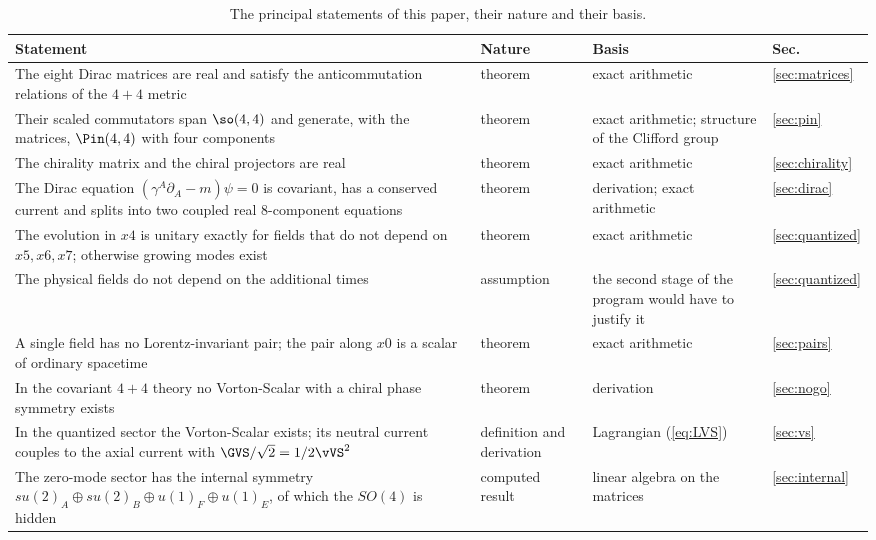 \begin{table}
\caption{\label{tab:status}The principal statements of this paper, their nature and their basis.}
\begin{ruledtabular}
\begin{tabular}{>{\raggedright\arraybackslash}p{}>{\raggedright\arraybackslash}p{}>{\raggedright\arraybackslash}p{}>{\raggedright\arraybackslash}p{}}
Statement & Nature & Basis & Sec. \\
\hline
The eight Dirac matrices are real and satisfy the anticommutation relations of the $4+4$ metric & theorem & exact arithmetic & \ref{sec:matrices} \\
Their scaled commutators span $\so(4,4)$ and generate, with the matrices, $\Pin(4,4)$ with four components & theorem & exact arithmetic; structure of the Clifford group & \ref{sec:pin} \\
The chirality matrix and the chiral projectors are real & theorem & exact arithmetic & \ref{sec:chirality} \\
The Dirac equation $(\gamma^A\partial_A-m)\psi=0$ is covariant, has a conserved current and splits into two coupled real 8-component equations & theorem & derivation; exact arithmetic & \ref{sec:dirac} \\
The evolution in $x4$ is unitary exactly for fields that do not depend on $x5,x6,x7$; otherwise growing modes exist & theorem & exact arithmetic & \ref{sec:quantized} \\
The physical fields do not depend on the additional times & assumption & the second stage of the program would have to justify it & \ref{sec:quantized} \\
A single field has no Lorentz-invariant pair; the pair along $x0$ is a scalar of ordinary spacetime & theorem & exact arithmetic & \ref{sec:pairs} \\
In the covariant $4+4$ theory no Vorton-Scalar with a chiral phase symmetry exists & theorem & derivation & \ref{sec:nogo} \\
In the quantized sector the Vorton-Scalar exists; its neutral current couples to the axial current with $\GVS/\sqrt2=1/2\vVS^2$ & definition and derivation & Lagrangian (\ref{eq:LVS}) & \ref{sec:vs} \\
The zero-mode sector has the internal symmetry $su(2)_A\oplus su(2)_B\oplus u(1)_F\oplus u(1)_E$, of which the $SO(4)$ is hidden & computed result & linear algebra on the matrices & \ref{sec:internal} \\

\end{tabular}
\end{ruledtabular}
\end{table}
